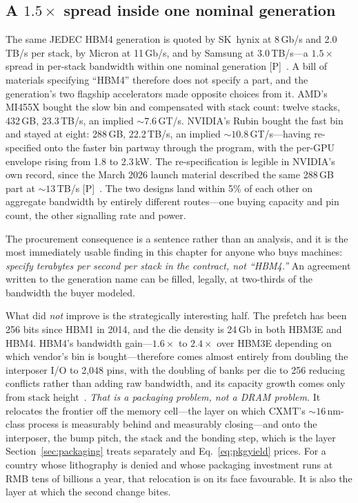 \subsection{A $1.5\times$ spread inside one nominal generation}

The same JEDEC HBM4 generation is quoted by SK~hynix at 8\,Gb/s and 2.0\,TB/s per stack, by Micron at 11\,Gb/s, and by Samsung at 3.0\,TB/s---a $1.5\times$ spread in per-stack bandwidth within one nominal generation [P]~\cite{hc2026-hbm4-spread}. A bill of materials specifying ``HBM4'' therefore does not specify a part, and the generation's two flagship accelerators made opposite choices from it. AMD's MI455X bought the slow bin and compensated with stack count: twelve stacks, 432\,GB, 23.3\,TB/s, an implied ${\sim}7.6$\,GT/s. NVIDIA's Rubin bought the fast bin and stayed at eight: 288\,GB, 22.2\,TB/s, an implied ${\sim}10.8$\,GT/s---having re-specified onto the faster bin partway through the program, with the per-GPU envelope rising from 1.8 to 2.3\,kW. The re-specification is legible in NVIDIA's own record, since the March 2026 launch material described the same 288\,GB part at ${\sim}13$\,TB/s [P]~\cite{nvidia-rubin-pod,vr200-power}. The two designs land within 5\% of each other on aggregate bandwidth by entirely different routes---one buying capacity and pin count, the other signalling rate and power.

The procurement consequence is a sentence rather than an analysis, and it is the most immediately usable finding in this chapter for anyone who buys machines: \emph{specify terabytes per second per stack in the contract, not ``HBM4.''} An agreement written to the generation name can be filled, legally, at two-thirds of the bandwidth the buyer modeled.

What did \emph{not} improve is the strategically interesting half. The prefetch has been 256 bits since HBM1 in 2014, and the die density is 24\,Gb in both HBM3E and HBM4. HBM4's bandwidth gain---$1.6\times$ to $2.4\times$ over HBM3E depending on which vendor's bin is bought---therefore comes almost entirely from doubling the interposer I/O to 2,048 pins, with the doubling of banks per die to 256 reducing conflicts rather than adding raw bandwidth, and its capacity growth comes only from stack height~\cite{hc2026-hbm4-spread}. \emph{That is a packaging problem, not a DRAM problem.} It relocates the frontier off the memory cell---the layer on which CXMT's ${\sim}16$\,nm-class process is measurably behind and measurably closing---and onto the interposer, the bump pitch, the stack and the bonding step, which is the layer Section~\ref{sec:packaging} treats separately and Eq.~\eqref{eq:pkgyield} prices. For a country whose lithography is denied and whose packaging investment runs at RMB tens of billions a year, that relocation is on its face favourable. It is also the layer at which the second change bites.

